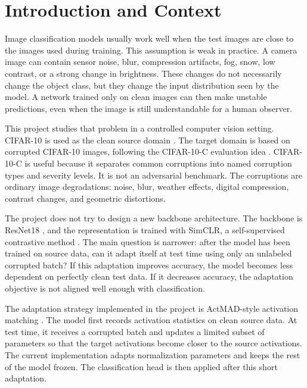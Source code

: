 \documentclass[a4paper,11pt]{article}
\begin{document}
\tableofcontents
\newpage

\section{Introduction and Context}

Image classification models usually work well when the test images are close to the images used during training. This assumption is weak in practice. A camera image can contain sensor noise, blur, compression artifacts, fog, snow, low contrast, or a strong change in brightness. These changes do not necessarily change the object class, but they change the input distribution seen by the model. A network trained only on clean images can then make unstable predictions, even when the image is still understandable for a human observer.

This project studies that problem in a controlled computer vision setting. CIFAR-10 is used as the clean source domain \citep{krizhevsky2009cifar}. The target domain is based on corrupted CIFAR-10 images, following the CIFAR-10-C evaluation idea \citep{hendrycks2019robustness}. CIFAR-10-C is useful because it separates common corruptions into named corruption types and severity levels. It is not an adversarial benchmark. The corruptions are ordinary image degradations: noise, blur, weather effects, digital compression, contrast changes, and geometric distortions.

The project does not try to design a new backbone architecture. The backbone is ResNet18 \citep{he2016resnet}, and the representation is trained with SimCLR, a self-supervised contrastive method \citep{chen2020simclr}. The main question is narrower: after the model has been trained on source data, can it adapt itself at test time using only an unlabeled corrupted batch? If this adaptation improves accuracy, the model becomes less dependent on perfectly clean test data. If it decreases accuracy, the adaptation objective is not aligned well enough with classification.

The adaptation strategy implemented in the project is ActMAD-style activation matching \citep{mirza2023actmad}. The model first records activation statistics on clean source data. At test time, it receives a corrupted batch and updates a limited subset of parameters so that the target activations become closer to the source activations. The current implementation adapts normalization parameters and keeps the rest of the model frozen. The classification head is then applied after this short adaptation.
\end{document}
